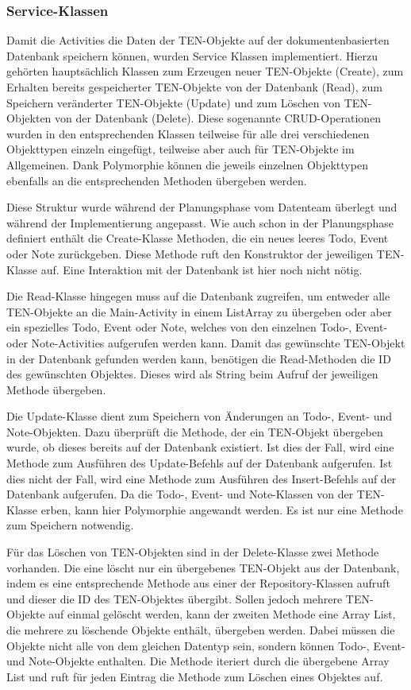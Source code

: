 \subsubsection{Service-Klassen}

Damit die Activities die Daten der TEN-Objekte auf der dokumentenbasierten Datenbank speichern können, wurden Service Klassen implementiert. Hierzu gehörten hauptsächlich Klassen zum Erzeugen neuer TEN-Objekte (Create), zum Erhalten bereits gespeicherter TEN-Objekte von der Datenbank (Read), zum Speichern veränderter TEN-Objekte (Update) und zum Löschen von TEN-Objekten von der Datenbank (Delete). Diese sogenannte CRUD-Operationen wurden in den entsprechenden Klassen teilweise für alle drei verschiedenen Objekttypen einzeln eingefügt, teilweise aber auch für TEN-Objekte im Allgemeinen. Dank Polymorphie können die jeweils einzelnen Objekttypen ebenfalls an die entsprechenden Methoden übergeben werden.

Diese Struktur wurde während der Planungsphase vom Datenteam überlegt und während der Implementierung angepasst. Wie auch schon in der Planungsphase definiert enthält die Create-Klasse Methoden, die ein neues leeres Todo, Event oder Note zurückgeben. Diese Methode ruft den Konstruktor der jeweiligen TEN-Klasse auf. Eine Interaktion mit der Datenbank ist hier noch nicht nötig.

Die Read-Klasse hingegen muss auf die Datenbank zugreifen, um entweder alle TEN-Objekte an die Main-Activity in einem ListArray zu übergeben oder aber ein spezielles Todo, Event oder Note, welches von den einzelnen Todo-, Event- oder Note-Activities aufgerufen werden kann. Damit das gewünschte TEN-Objekt in der Datenbank gefunden werden kann, benötigen die Read-Methoden die ID des gewünschten Objektes. Dieses wird als String beim Aufruf der jeweiligen Methode übergeben.

Die Update-Klasse dient zum Speichern von Änderungen an Todo-, Event- und Note-Objekten. Dazu überprüft die Methode, der ein TEN-Objekt übergeben wurde, ob dieses bereits auf der Datenbank existiert. Ist dies der Fall, wird eine Methode zum Ausführen des Update-Befehls auf der Datenbank aufgerufen. Ist dies nicht der Fall, wird eine Methode zum Ausführen des Insert-Befehls auf der Datenbank aufgerufen. Da die Todo-, Event- und Note-Klassen von der TEN-Klasse erben, kann hier Polymorphie angewandt werden. Es ist nur eine Methode zum Speichern notwendig.

Für das Löschen von TEN-Objekten sind in der Delete-Klasse zwei Methode vorhanden. Die eine löscht nur ein übergebenes TEN-Objekt aus der Datenbank, indem es eine entsprechende Methode aus einer der Repository-Klassen aufruft und dieser die ID des TEN-Objektes übergibt. Sollen jedoch mehrere TEN-Objekte auf einmal gelöscht werden, kann der zweiten Methode eine Array List, die mehrere zu löschende Objekte enthält, übergeben werden. Dabei müssen die Objekte nicht alle von dem gleichen Datentyp sein, sondern können Todo-, Event- und Note-Objekte enthalten. Die Methode iteriert durch die übergebene Array List und ruft für jeden Eintrag die Methode zum Löschen eines Objektes auf.


